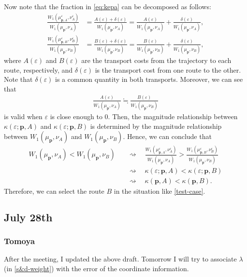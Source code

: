 \documentclass{article}
\numberwithin{equation}{section}
\theoremstyle{definition}
\newcommand{\K}{\kappa}
\newcommand{\eps}{\varepsilon} %
\def\comar{$\rightsquigarrow$}%
\begin{document}
Now note that the fraction in \eqref{eq:kepa} can be decomposed as follows:
\begin{align}
    \frac{W_1(\mu_{\mathbf{p},A}^\eps,\nu_A^\eps)}{W_1(\mu_\mathbf{p},\nu_A)}
    &= \frac{A(\eps)+\delta(\eps)}{W_1(\mu_\mathbf{p},\nu_A)} 
    = \frac{A(\eps)}{W_1(\mu_\mathbf{p},\nu_A)} + \frac{\delta(\eps)}{W_1(\mu_\mathbf{p},\nu_A)}, \label{A(e)} \\
    \frac{W_1(\mu_{\mathbf{p},B}^\eps,\nu_B^\eps)}{W_1(\mu_\mathbf{p},\nu_B)} 
    &= \frac{B(\eps)+\delta(\eps)}{W_1(\mu_\mathbf{p},\nu_B)} 
    = \frac{B(\eps)}{W_1(\mu_\mathbf{p},\nu_B)} + \frac{\delta(\eps)}{W_1(\mu_\mathbf{p},\nu_B)}, \label{B(e)}
\end{align}
where $A(\eps)$ and $B(\eps)$ are the transport costs from the trajectory to each route, respectively, and $\delta(\eps)$ is the transport cost from one route to the other.
Note that $\delta(\eps)$ is a common quantity in both transports.
Moreover, we can see that 
\begin{align*}
    \frac{A(\eps)}{W_1(\mu_\mathbf{p},\nu_A)} \fallingdotseq \frac{B(\eps)}{W_1(\mu_\mathbf{p},\nu_B)}
\end{align*}
is valid when $\eps$ is close enough to $0$.
Then, the magnitude relationship between $\K(\eps;\mathbf{p},A)$ and $\K(\eps;\mathbf{p},B)$ is determined by the magnitude relationship between $W_1(\mu_\mathbf{p},\nu_A)$ and $W_1(\mu_\mathbf{p},\nu_B)$.
Hence, we can conclude that
\begin{align*}
    W_1(\mu_\mathbf{p},\nu_A) < W_1(\mu_\mathbf{p},\nu_B) &\quad\text{\comar}\quad 
     \frac{W_1(\mu_{\mathbf{p},A}^\eps,\nu_A^\eps)}{W_1(\mu_\mathbf{p},\nu_A)} 
    > \frac{W_1(\mu_{\mathbf{p},B}^\eps,\nu_B^\eps)}{W_1(\mu_\mathbf{p},\nu_B)} \\
    &\quad\text{\comar}\quad \K(\eps;\mathbf{p},A) < \K(\eps;\mathbf{p},B) \\
    &\quad\text{\comar}\quad \K(\mathbf{p},A) < \K(\mathbf{p},B).
\end{align*}
Therefore, we can select the route $B$ in the situation like \autoref{test-case}.

\subsection{July 28th}
\subsubsection*{Tomoya}
After the meeting, I updated the above draft.
Tomorrow I will try to associate $\lambda$ (in \autoref{s&d-weight}) with the error of the coordinate information.
\end{document}
